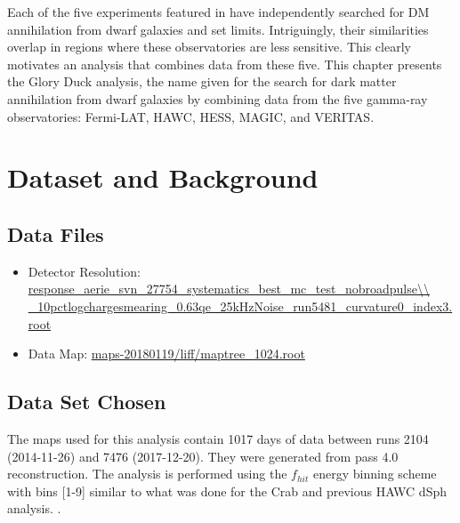 Each of the five experiments featured in  have independently searched for DM annihilation from dwarf galaxies and set limits.
Intriguingly, their similarities overlap in regions where these observatories are less sensitive.
This clearly motivates an analysis that combines data from these five.
This chapter presents the Glory Duck analysis, the name given for the search for dark matter annihilation from dwarf galaxies by combining data from the five gamma-ray observatories: Fermi-LAT, HAWC, HESS, MAGIC, and VERITAS.

\section{Dataset and Background \label{sec:gd_databgd}}

\subsection{Data Files}\label{sec:gd_data}
\begin{itemize}
    \item Detector Resolution: \url{response\_aerie\_svn\_27754\_systematics\_best\_mc\_test\_nobroadpulse\\
    \_10pctlogchargesmearing\_0.63qe\_25kHzNoise\_run5481\_curvature0\_index3.root}
    \item Data Map: \url{maps-20180119/liff/maptree\_1024.root}
\end{itemize}

\subsection{Data Set Chosen}

The maps used for this analysis contain 1017 days of data between runs 2104 (2014-11-26) and 7476 (2017-12-20). They were generated from pass 4.0 reconstruction.
The analysis is performed using the $f_{hit}$ energy binning scheme with bins [1-9] similar to what was done for the Crab and previous HAWC dSph analysis. \cite{Abeysekara_2017,Albert_2018}.

